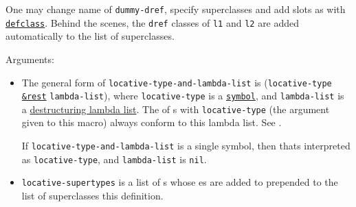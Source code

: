 \begin{itemize}
\begin{itemize}
\begin{Shaded}
\begin{Highlighting}[]
\NormalTok{  (}\NormalTok{()}
\end{Highlighting}
\end{Shaded}

    One may change name of \texttt{dummy-dref}, specify superclasses and
    add slots as with
    \href{http://www.lispworks.com/documentation/HyperSpec/Body/m_defcla.htm}{\texttt{defclass}}.
    Behind the scenes, the \texttt{dref} classes of \texttt{l1} and
    \texttt{l2} are added automatically to the list of superclasses.
  \end{itemize}

  Arguments:

  \begin{itemize}
  \item
    The general form of \texttt{locative-type-and-lambda-list} is
    (\texttt{locative-type}
    \href{http://www.lispworks.com/documentation/HyperSpec/Body/03_da.htm}{\texttt{\&rest}}
    \texttt{lambda-list}), where \texttt{locative-type} is a
    \href{http://www.lispworks.com/documentation/HyperSpec/Body/t_symbol.htm}{\texttt{symbol}},
    and \texttt{lambda-list} is a
    \href{http://www.lispworks.com/documentation/HyperSpec/Body/26_glo_d.htm\#destructuring_lambda_list}{destructuring
    lambda list}. The
    of s with
     \texttt{locative-type} (the argument given to this
    macro) always conform to this lambda list. See
    .

    If \texttt{locative-type-and-lambda-list} is a single symbol, then
    that\textquotesingle s interpreted as \texttt{locative-type}, and
    \texttt{lambda-list} is \texttt{nil}.
  \item
    \texttt{locative-supertypes} is a list of
    s whose
    es
    are added to prepended to the list of superclasses this definition.
  \end{itemize}


\end{itemize}
